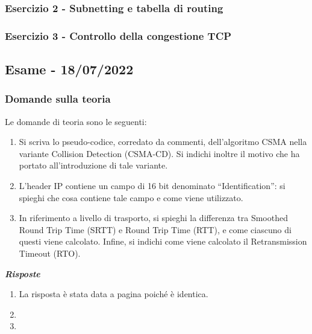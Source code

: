\documentclass[a4paper]{article}
\newcommand{\dquotes}[1]{``#1''}
\begin{document}
	\subsubsection{Esercizio 2 - Subnetting e tabella di routing}
	
	\subsubsection{Esercizio 3 - Controllo della congestione TCP}
	
	\newpage

	\subsection[\textbf{Esame - 18/07/2022}]{Esame - 18/07/2022}
	
	\subsubsection{Domande sulla teoria}
	Le domande di teoria sono le seguenti:
	\begin{enumerate}
		\item Si scriva lo pseudo-codice, corredato da commenti, dell'algoritmo CSMA nella variante Collision Detection (CSMA-CD). Si indichi inoltre il motivo che ha portato all'introduzione di tale variante.
		
		\item L'header IP contiene un campo di 16 bit denominato \dquotes{Identification}: si spieghi che cosa contiene tale campo e come viene utilizzato.
		
		\item In riferimento a livello di trasporto, si spieghi la differenza tra Smoothed Round Trip Time (SRTT) e Round Trip Time (RTT), e come ciascuno di questi viene calcolato. Infine, si indichi come viene calcolato il Retransmission Timeout (RTO).
	\end{enumerate}
	\textcolor{Green4}{\textbf{\emph{Risposte}}}
	\begin{enumerate}
		\item La risposta è stata data a pagina \pageref{CSMA/CD} poiché è identica.
		
		\item 
		
		\item 
	\end{enumerate}
	
\end{document}
